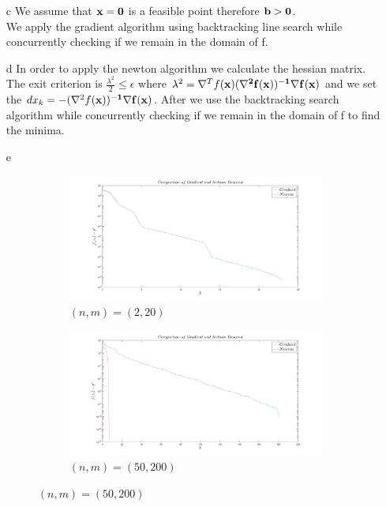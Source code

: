 \documentclass[12pt]{article}
\begin{document}
\begin{enumerate}
\begin{enumerate}
		\item[c]
		We assume that ${\bf x}={\bf 0}$ is a feasible point therefore ${\bf b}>{\bf 0}$.\\
		We apply the gradient algorithm using backtracking line search while concurrently checking if we remain in the domain of f.
		
		\item[d]
		In order to apply the newton algorithm we calculate the hessian matrix. The exit criterion is $\frac{\lambda^2}{2}\leq \epsilon$ where $\lambda^2=\nabla^Tf(\bf x)(\nabla^2f(\bf x))^{-1}\nabla f(\bf x)$ and we set the $dx_k=-(\nabla^2f(\bf x))^{-1}\nabla f(\bf x)$. After we use the backtracking search algorithm while concurrently checking if we remain in the domain of f to find the minima.
		\newpage
		\item[e]
		\begin{figure}
			\centering
			\begin{subfigure}[b]{0.45\textwidth}
				\centering
				\includegraphics[width=\textwidth]{C_e_1.png}
				\caption{$(n,m)=(2,20)$}
			\end{subfigure}
			\hfill
			\begin{subfigure}[b]{0.45\textwidth}
				\centering
				\includegraphics[width=\textwidth]{C_e_2.png}
				\caption{$(n,m)=(50,200)$}

\end{subfigure}
\end{figure}
\end{enumerate}
\end{enumerate}
\end{document}
